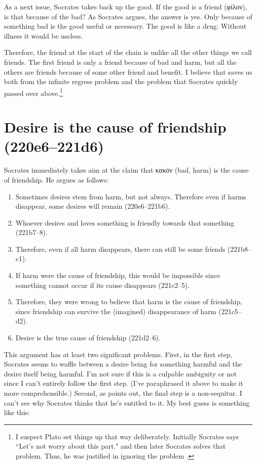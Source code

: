 \documentclass[11pt]{article}
\begin{document}
As a next issue, Socrates takes back up the good.  If the good is a friend (φίλον), is that because of the bad?  As Socrates argues, the answer is yes.  Only because of something bad is the good useful or necessary.  The good is like a drug: Without illness it would be useless.

Therefore, the friend at the start of the chain is unlike all the other things we call friends.  The first friend is only a friend because of bad and harm, but all the others are friends because of some other friend and benefit.  I believe that saves us both from the infinite regress problem and the problem that Socrates quickly passed over above.\footnote{I suspect Plato set things up that way deliberately.  Initially Socrates says ``Let's not worry about this part." and then later Socrates solves that problem.  Thus, he was justified in ignoring the problem .}

\section{Desire is the cause of friendship (220e6--221d6)}

Socrates immediately takes aim at the claim that κακόν (bad, harm) is the cause of friendship.  He argues as follows:

\begin{enumerate}
    \item Sometimes desires stem from harm, but not always.  Therefore even if harms disappear, some desires will remain (220e6--221b6).
    \item Whoever desires and loves something is friendly towards that something (221b7--8).
    \item Therefore, even if all harm disappears, there can still be some friends (221b8--c1).
    \item If harm were the cause of friendship, this would be impossible since something cannot occur if its cause disappears (221c2--5).
    \item Therefore, they were wrong to believe that harm is the cause of friendship, since friendship can survive the (imagined) disappearance of harm (221c5--d2).
    \item Desire is the true cause of friendship (221d2--6).
\end{enumerate}

This argument has at least two significant problems.  First, in the first step, Socrates seems to waffle between a desire being for something harmful and the desire itself being harmful.  I'm not sure if this is a culpable ambiguity or not since I can't entirely follow the first step. (I've paraphrased it above to make it more comprehensible.)  Second, as \citet{watt1987} points out, the final step is a non-sequitur.  I can't see why Socrates thinks that he's entitled to it.  My best guess is something like this:
\end{document}
